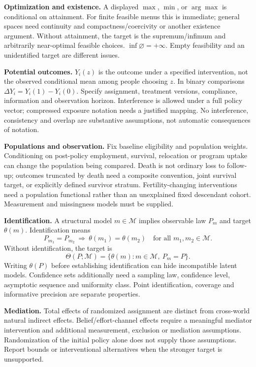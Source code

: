 \documentclass[11pt,a4paper]{article}
\begin{document}
\textbf{Optimization and existence.} A displayed \(\max\), \(\min\), or \(\arg\max\) is conditional on attainment. For finite feasible menus this is immediate; general spaces need continuity and compactness/coercivity or another existence argument. Without attainment, the target is the supremum/infimum and arbitrarily near-optimal feasible choices. \(\inf\varnothing=+\infty\). Empty feasibility and an unidentified target are different issues.

\textbf{Potential outcomes.} \(Y_i(z)\) is the outcome under a specified intervention, not the observed conditional mean among people choosing \(z\). In binary comparisons \(\Delta Y_i=Y_i(1)-Y_i(0)\). Specify assignment, treatment versions, compliance, information and observation horizon. Interference is allowed under a full policy vector; compressed exposure notation needs a justified mapping. No interference, consistency and overlap are substantive assumptions, not automatic consequences of notation.

\textbf{Populations and observation.} Fix baseline eligibility and population weights. Conditioning on post-policy employment, survival, relocation or program uptake can change the population being compared. Death is not ordinary loss to follow-up; outcomes truncated by death need a composite convention, joint survival target, or explicitly defined survivor stratum. Fertility-changing interventions need a population functional rather than an unexplained fixed descendant cohort. Measurement and missingness models must be supplied.

\textbf{Identification.} A structural model \(m\in\mathcal M\) implies observable law \(P_m\) and target \(\theta(m)\). Identification means
\[
 P_{m_1}=P_{m_2}\ \Longrightarrow\ \theta(m_1)=\theta(m_2)
 \quad\text{for all }m_1,m_2\in\mathcal M .
\]
Without identification, the target is
\[
 \Theta(P;\mathcal M)=\{\theta(m):m\in\mathcal M,\ P_m=P\}.
\]
Writing \(\theta(P)\) before establishing identification can hide incompatible latent models. Confidence sets additionally need a sampling law, confidence level, asymptotic sequence and uniformity class. Point identification, coverage and informative precision are separate properties.

\textbf{Mediation.} Total effects of randomized assignment are distinct from cross-world natural indirect effects. Belief/effort-channel effects require a meaningful mediator intervention and additional measurement, exclusion or mediation assumptions. Randomization of the initial policy alone does not supply those assumptions. Report bounds or interventional alternatives when the stronger target is unsupported.
\end{document}
